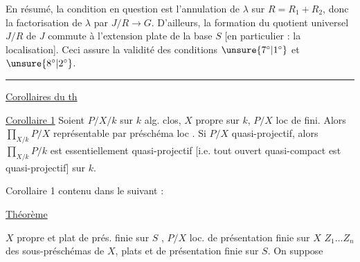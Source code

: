 En résumé, la condition en question est
l'annulation de $\lambda$ sur $R=R_1+R_2$,
donc la factorisation de $\lambda$ par $J/R\longrightarrow G$.
D'ailleurs, la formation du quotient universel
$J/R$ de $J$ commute à l'extension plate
de la base $S$ [en particulier : la localisation].
Ceci assure la validité des conditions
\uline{$\unsure{7^\circ|1^\circ}$} et \uline{$\unsure{8^\circ|2^\circ}$}.
\par\noindent\rule{\linewidth}{0.4pt}\par
\uline{Corollaires du th}

\uline{Corollaire 1} Soient $P/X/k$ sur $k$ alg. clos,
$X$ propre sur $k$, $P/X$ loc de   fini. Alors
$\displaystyle\prod_{X/k}P/X$ représentable par préschéma loc .
Si $P/X$ quasi-projectif, 
alors $\displaystyle\prod_{X/k}P/k$ est
essentiellement quasi-projectif [i.e. tout ouvert
quasi-compact est quasi-projectif] sur $k$.

Corollaire 1  contenu dans le suivant :

\uline{Théorème}

$X$ propre et plat de prés. finie sur $S$ ,
$P/X$ loc. de présentation finie sur $X$
$Z_1\ldots Z_n$ des sous-préschémas  de $X$, plats et de présentation finie
sur $S$. On suppose

